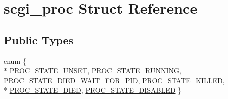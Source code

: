 \hypertarget{structscgi__proc}{\section{scgi\-\_\-proc Struct Reference}
\label{structscgi__proc}
}
\subsection*{Public Types}
\begin{DoxyCompactItemize}
\item 
enum \{ \\*
\hyperlink{structscgi__proc_a22b30f271abaa36d184a5be409aeadcaa5f716e6d6aac1f24da978a4d65cfefe7}{P\-R\-O\-C\-\_\-\-S\-T\-A\-T\-E\-\_\-\-U\-N\-S\-E\-T}, 
\hyperlink{structscgi__proc_a22b30f271abaa36d184a5be409aeadcaaa973460346b7ca06a2b00657e9064148}{P\-R\-O\-C\-\_\-\-S\-T\-A\-T\-E\-\_\-\-R\-U\-N\-N\-I\-N\-G}, 
\hyperlink{structscgi__proc_a22b30f271abaa36d184a5be409aeadcaaee44ce0af0629134dad57834c26fb464}{P\-R\-O\-C\-\_\-\-S\-T\-A\-T\-E\-\_\-\-D\-I\-E\-D\-\_\-\-W\-A\-I\-T\-\_\-\-F\-O\-R\-\_\-\-P\-I\-D}, 
\hyperlink{structscgi__proc_a22b30f271abaa36d184a5be409aeadcaab5916089a3ba78d20bb2bda9805db1b7}{P\-R\-O\-C\-\_\-\-S\-T\-A\-T\-E\-\_\-\-K\-I\-L\-L\-E\-D}, 
\\*
\hyperlink{structscgi__proc_a22b30f271abaa36d184a5be409aeadcaa05ff1cb3203a4ce40c90487da67b7e47}{P\-R\-O\-C\-\_\-\-S\-T\-A\-T\-E\-\_\-\-D\-I\-E\-D}, 
\hyperlink{structscgi__proc_a22b30f271abaa36d184a5be409aeadcaa145b6ad4803e704802ccbf45a1ab6769}{P\-R\-O\-C\-\_\-\-S\-T\-A\-T\-E\-\_\-\-D\-I\-S\-A\-B\-L\-E\-D}
 \}
\end{DoxyCompactItemize}
